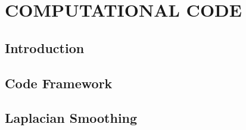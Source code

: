 \chapter{\textbf{COMPUTATIONAL CODE}}
\label{codigo numerico}

\section{\textbf{Introduction}} 


\section{\textbf{Code Framework}} 
\label{mesh updating}


\section{\textbf{Laplacian Smoothing}} 
\label{laplacian smoothing}


